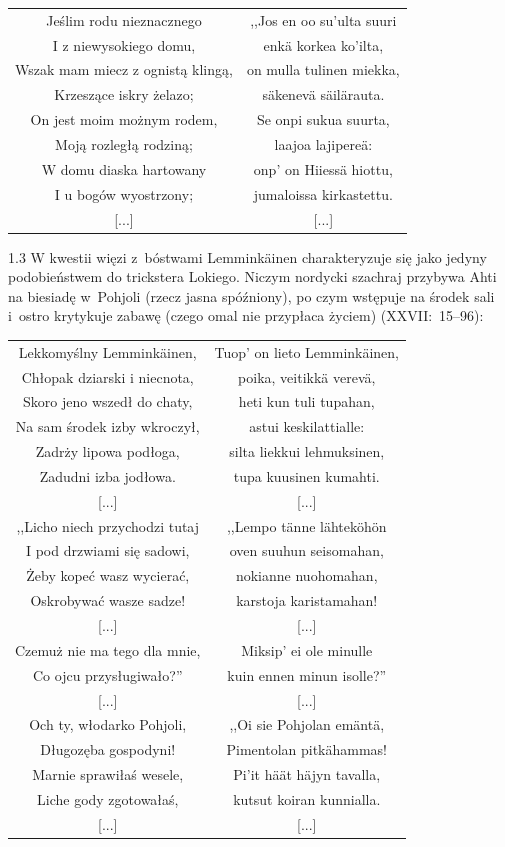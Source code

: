 \documentclass[11pt,a4paper,twoside]{report}
\begin{document}
{\centering
\small
\begin{longtable}{c c}
Jeślim rodu nieznacznego & ,,Jos en oo su'ulta suuri \\
I z niewysokiego domu, & enkä korkea ko'ilta, \\
Wszak mam miecz z ognistą klingą, & on mulla tulinen miekka, \\
Krzeszące iskry żelazo; & säkenevä säilärauta. \\
On jest moim możnym rodem, & Se onpi sukua suurta, \\
Moją rozległą rodziną; & laajoa lajipereä: \\
W domu diaska hartowany & onp' on Hiiessä hiottu, \\
I u bogów wyostrzony; & jumaloissa kirkastettu. \\
{[...]} & {[...]} \\
\end{longtable}
}
\begin{spacing}{1.3}
W kwestii więzi z~bóstwami Lemminkäinen charakteryzuje się jako jedyny podobieństwem do trickstera Lokiego. Niczym nordycki szachraj przybywa Ahti na biesiadę w~Pohjoli (rzecz jasna spóźniony), po czym wstępuje na środek sali i~ostro krytykuje zabawę (czego omal nie przypłaca życiem) (XXVII:~15--96):
\end{spacing}
{\centering
\small
\begin{longtable}{c c}
Lekkomyślny Lemminkäinen, & Tuop' on lieto Lemminkäinen, \\
Chłopak dziarski i niecnota, & poika, veitikkä verevä, \\
Skoro jeno wszedł do chaty, & heti kun tuli tupahan, \\
Na sam środek izby wkroczył, & astui keskilattialle: \\
Zadrży lipowa podłoga, & silta liekkui lehmuksinen, \\
Zadudni izba jodłowa. & tupa kuusinen kumahti. \\
{[...]} & {[...]} \\
,,Licho niech przychodzi tutaj & ,,Lempo tänne lähteköhön \\
I pod drzwiami się sadowi, & oven suuhun seisomahan, \\
Żeby kopeć wasz wycierać, & nokianne nuohomahan,\\
Oskrobywać wasze sadze! & karstoja karistamahan!\\
{[...]} & {[...]} \\
Czemuż nie ma tego dla mnie, & Miksip' ei ole minulle \\
Co ojcu przysługiwało?'' & kuin ennen minun isolle?'' \\
{[...]} & {[...]} \\
Och ty, włodarko Pohjoli, & ,,Oi sie Pohjolan emäntä, \\
Długozęba gospodyni! & Pimentolan pitkähammas! \\
Marnie sprawiłaś wesele, & Pi'it häät häjyn tavalla,\\
Liche gody zgotowałaś, & kutsut koiran kunnialla.\\
{[...]} & {[...]} \\
\end{longtable}
}
\vspace*{0.5\baselineskip}
\end{document}
